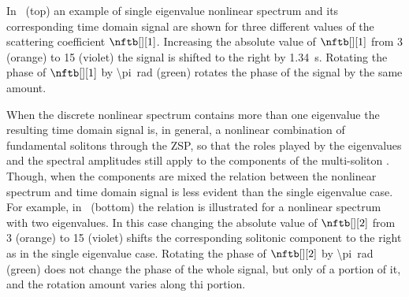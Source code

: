 In ~(top) an example of single eigenvalue nonlinear spectrum and its corresponding time domain signal are shown for three different values of the scattering coefficient $\nftb[][1]$. Increasing the absolute value of $\nftb[][1]$ from 3 (orange) to 15 (violet) the signal is shifted to the right by \SI{1.34}{\s}. Rotating the phase of $\nftb[][1]$ by \SI{\pi}{\radian} (green) rotates the phase of the signal by the same amount.



When the discrete nonlinear spectrum contains more than one eigenvalue the
resulting time domain signal is, in general, a nonlinear combination of
fundamental solitons through the \ac{ZSP}, so that
the roles played by the eigenvalues and the spectral amplitudes still apply to the
components of the multi-soliton \cite{shabat1972exact}. Though, when the  components are mixed the relation between the nonlinear spectrum and time domain signal is less evident than the single eigenvalue case.
For example, in ~(bottom) the relation is illustrated for a nonlinear spectrum with two eigenvalues. In this case changing the absolute
value of $\nftb[][2]$ from 3 (orange) to 15 (violet) shifts the corresponding
solitonic component to the right as in the single eigenvalue case. Rotating the phase of $\nftb[][2]$ by \SI{\pi}{\radian} (green) does not change the phase of the whole signal, but only of a portion of it, and the rotation amount varies along thi portion.


